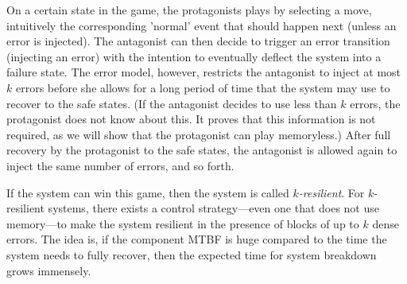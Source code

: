 On a certain state in the game, the protagonists plays by selecting a move, intuitively the corresponding 'normal' event that should happen next (unless an error is injected).
The antagonist can then decide to trigger an error transition (injecting an error) with the intention to eventually deflect the system into a failure state.
The error model, however, restricts the antagonist to inject at most $k$ errors before she allows for a long period of time that the system may use to recover to the safe states.
(If the antagonist decides to use less than $k$ errors, the protagonist does not know about this. It proves that this information is not required, as we will show that the protagonist can play memoryless.)
After full recovery by the protagonist to the safe states, the antagonist is allowed again to inject the same number of errors, and so forth.
  
If the system can win this game, then the system is called {\em $k$-resilient}.
For $k$-resilient systems, there exists a control strategy---even one that does not use memory---to make the system resilient in the presence of blocks of up to $k$ dense errors. 
The idea is, if the component MTBF is huge compared to the time the system needs to fully recover, then the expected time for system breakdown grows immensely.  


